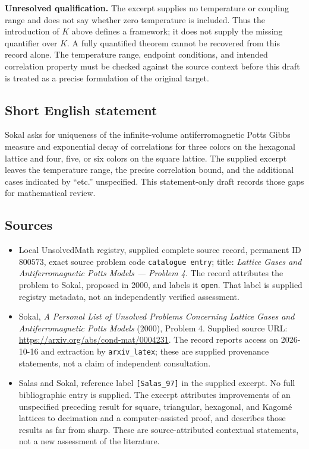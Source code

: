 \documentclass[11pt]{article}
\begin{document}
\textbf{Unresolved qualification.} The excerpt supplies no temperature or coupling range and does not say whether zero temperature is included. Thus the introduction of \(K\) above defines a framework; it does not supply the missing quantifier over \(K\). A fully quantified theorem cannot be recovered from this record alone. The temperature range, endpoint conditions, and intended correlation property must be checked against the source context before this draft is treated as a precise formulation of the original target.
\subsection{Short English statement}
Sokal asks for uniqueness of the infinite-volume antiferromagnetic Potts Gibbs measure and exponential decay of correlations for three colors on the hexagonal lattice and four, five, or six colors on the square lattice. The supplied excerpt leaves the temperature range, the precise correlation bound, and the additional cases indicated by ``etc.'' unspecified. This statement-only draft records those gaps for mathematical review.
\subsection{Sources}
\begin{itemize}
\item Local UnsolvedMath registry, supplied complete source record, permanent ID \(800573\), exact source problem code \texttt{catalogue entry}; title: \emph{Lattice Gases and Antiferromagnetic Potts Models --- Problem 4}. The record attributes the problem to Sokal, proposed in 2000, and labels it \texttt{open}. That label is supplied registry metadata, not an independently verified assessment.
\item Sokal, \emph{A Personal List of Unsolved Problems Concerning Lattice Gases and Antiferromagnetic Potts Models} (2000), Problem 4. Supplied source URL: \url{https://arxiv.org/abs/cond-mat/0004231}. The record reports access on 2026-10-16 and extraction by \texttt{arxiv\_latex}; these are supplied provenance statements, not a claim of independent consultation.
\item Salas and Sokal, reference label \texttt{[Salas\_97]} in the supplied excerpt. No full bibliographic entry is supplied. The excerpt attributes improvements of an unspecified preceding result for square, triangular, hexagonal, and Kagom\'e lattices to decimation and a computer-assisted proof, and describes those results as far from sharp. These are source-attributed contextual statements, not a new assessment of the literature.
\end{itemize}
\end{document}
